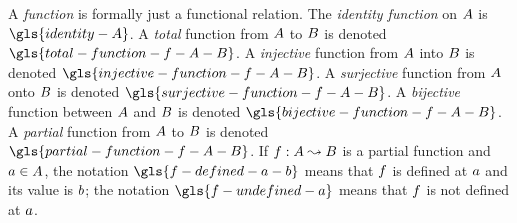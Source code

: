 
A \emph{function} is formally just a functional relation. The \emph{identity
function} on $A$ is $\gls{identity-A}$.
A \emph{total} function from $A$ to $B$ is denoted
$\gls{total-function-f-A-B}$.
A \emph{injective} function from $A$ into $B$ is denoted
$\gls{injective-function-f-A-B}$.
A \emph{surjective} function from $A$ onto $B$ is denoted
$\gls{surjective-function-f-A-B}$.
A \emph{bijective} function between $A$ and $B$ is denoted
$\gls{bijective-function-f-A-B}$.
A \emph{partial} function from $A$ to $B$ is denoted
$\gls{partial-function-f-A-B}$. If $f : A \leadsto B$ is a partial
function and $a \in A$, the notation $\gls{f-defined-a-b}$ means that
$f$ is defined at $a$ and its value is $b$;
the notation $\gls{f-undefined-a}$ means that $f$ is not defined at $a$.